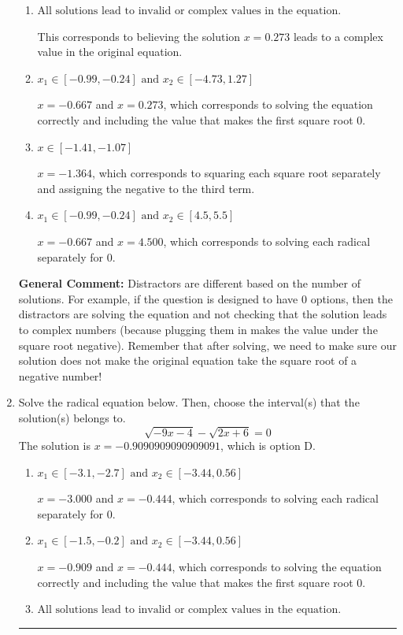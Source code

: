 \documentclass{extbook}[14pt]
\newcommand{\litem}[1]{\item #1

\rule{\textwidth}{0.4pt}}
\begin{document}
\begin{enumerate}
{\begin{enumerate}[label=\Alph*.]
* $x = 0.273$, which is the correct option.
\item \( \text{All solutions lead to invalid or complex values in the equation.} \)

This corresponds to believing the solution $x = 0.273$ leads to a complex value in the original equation.
\item \( x_1 \in [-0.99, -0.24] \text{ and } x_2 \in [-4.73,1.27] \)

$x = -0.667$ and $x = 0.273$, which corresponds to solving the equation correctly and including the value that makes the first square root 0.
\item \( x \in [-1.41,-1.07] \)

$x = -1.364$, which corresponds to squaring each square root separately and assigning the negative to the third term.
\item \( x_1 \in [-0.99, -0.24] \text{ and } x_2 \in [4.5,5.5] \)

$x = -0.667$ and $x = 4.500$, which corresponds to solving each radical separately for 0.
\end{enumerate}

\textbf{General Comment:} Distractors are different based on the number of solutions. For example, if the question is designed to have 0 options, then the distractors are solving the equation and not checking that the solution leads to complex numbers (because plugging them in makes the value under the square root negative). Remember that after solving, we need to make sure our solution does not make the original equation take the square root of a negative number!
}
\litem{
Solve the radical equation below. Then, choose the interval(s) that the solution(s) belongs to.
\[ \sqrt{-9 x - 4} - \sqrt{2 x + 6} = 0 \]The solution is \( x = -0.9090909090909091 \), which is option D.\begin{enumerate}[label=\Alph*.]
\item \( x_1 \in [-3.1, -2.7] \text{ and } x_2 \in [-3.44,0.56] \)

$x = -3.000$ and $x = -0.444$, which corresponds to solving each radical separately for 0.
\item \( x_1 \in [-1.5, -0.2] \text{ and } x_2 \in [-3.44,0.56] \)

$x = -0.909$ and $x = -0.444$, which corresponds to solving the equation correctly and including the value that makes the first square root 0.
\item \( \text{All solutions lead to invalid or complex values in the equation.} \)


\end{enumerate}}
\end{enumerate}
\end{document}
